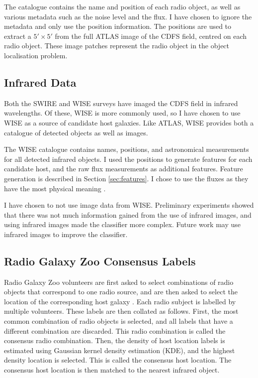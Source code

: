 
    The catalogue contains the name and position of each radio object, as well as various metadata such as the noise level and the flux. I have chosen to ignore the metadata and only use the position information. The positions are used to extract a $5' \times 5'$ from the full ATLAS image of the CDFS field, centred on each radio object. These image patches represent the radio object in the object localisation problem.

  \subsection{Infrared Data}

    Both the SWIRE and WISE surveys have imaged the CDFS field in infrared wavelengths. Of these, WISE is more commonly used, so I have chosen to use WISE as a source of candidate host galaxies. Like ATLAS, WISE provides both a catalogue of detected objects as well as images.

    The WISE catalogue contains names, positions, and astronomical measurements for all detected infrared objects. I used the positions to generate features for each candidate host, and the raw flux measurements as additional features. Feature generation is described in Section \ref{sec:features}. I chose to use the fluxes as they have the most physical meaning .

    I have chosen to not use image data from WISE. Preliminary experiments showed that there was not much information gained from the use of infrared images, and using infrared images made the classifier more complex. Future work may use infrared images to improve the classifier.

  \subsection{Radio Galaxy Zoo Consensus Labels}
  \label{sec:consensuses}

    
    Radio Galaxy Zoo volunteers are first asked to select combinations of radio
    objects that correspond to one radio source, and are then asked to select
    the location of the corresponding host galaxy \citep{banfield15}. Each
    radio subject is labelled by multiple volunteers. These labels are then
    collated as follows. First, the most common combination of radio objects is
    selected, and all labels that have a different combination are discarded.
    This radio combination is called the consensus radio combination. Then, the
    density of host location labels is estimated using Gaussian kernel density
    estimation (KDE), and the highest density location is selected. This is
    called the consensus host location. The consensus host location is then
    matched to the nearest infrared object.

